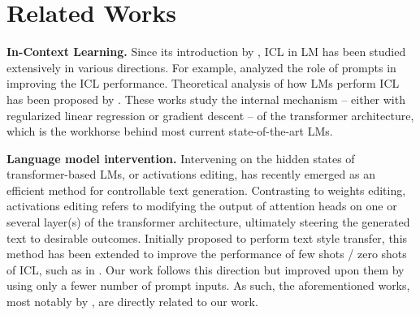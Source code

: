 \section{Related Works}
\textbf{In-Context Learning.} Since its introduction by \citet{ref:brown2020language}, ICL in LM has been studied extensively in various directions. For example, \citet{ref:reynolds2021prompt,ref:yoo2022ground} analyzed the role of prompts in improving the ICL performance. Theoretical analysis of how LMs perform ICL has been proposed by \citet{ref:akyurek2022learning,ref:dai2023can,ref:von2023transformers,ref:sander2024transformers}. These works study the internal mechanism -- either with regularized linear regression or gradient descent -- of the transformer architecture, which is the workhorse behind most current state-of-the-art LMs. 

\textbf{Language model intervention.} Intervening on the hidden states of transformer-based LMs, or activations editing, has recently emerged as an efficient method for controllable text generation. Contrasting to weights editing, activations editing refers to modifying the output of attention heads on one or several layer(s) of the transformer architecture, ultimately steering the generated text to desirable outcomes. Initially proposed to perform text style transfer, this method has been extended to improve the performance of few shots / zero shots of ICL, such as in \citet{ref:todd2023function,ref:liu2023context,ref:hendel2023incontext,ref:li2024context,ref:hernandez2024linearity}. Our work follows this direction but improved upon them by using only a fewer number of prompt inputs. As such, the aforementioned works, most notably by \citet{ref:todd2023function}, are directly related to our work.